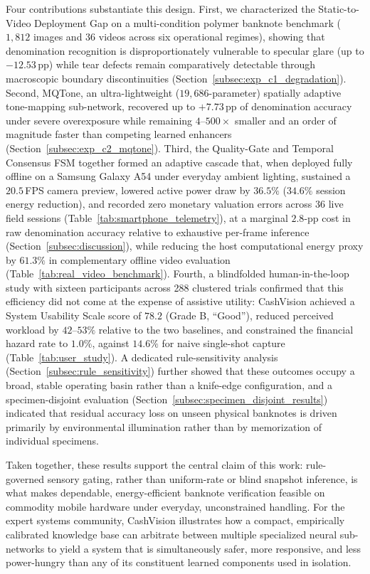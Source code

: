 \documentclass[final,5p,times,twocolumn,authoryear]{elsarticle}
\begin{document}
Four contributions substantiate this design. First, we characterized the Static-to-Video Deployment Gap on a multi-condition polymer banknote benchmark ($1{,}812$ images and $36$ videos across six operational regimes), showing that denomination recognition is disproportionately vulnerable to specular glare (up to $-12.53$\,pp) while tear defects remain comparatively detectable through macroscopic boundary discontinuities (Section~\ref{subsec:exp_c1_degradation}). Second, MQTone, an ultra-lightweight ($19{,}686$-parameter) spatially adaptive tone-mapping sub-network, recovered up to $+7.73$\,pp of denomination accuracy under severe overexposure while remaining $4$--$500\times$ smaller and an order of magnitude faster than competing learned enhancers (Section~\ref{subsec:exp_c2_mqtone}). Third, the Quality-Gate and Temporal Consensus FSM together formed an adaptive cascade that, when deployed fully offline on a Samsung Galaxy A54 under everyday ambient lighting, sustained a $20.5$\,FPS camera preview, lowered active power draw by $36.5\%$ ($34.6\%$ session energy reduction), and recorded zero monetary valuation errors across 36 live field sessions (Table~\ref{tab:smartphone_telemetry}), at a marginal $2.8$-pp cost in raw denomination accuracy relative to exhaustive per-frame inference (Section~\ref{subsec:discussion}), while reducing the host computational energy proxy by $61.3\%$ in complementary offline video evaluation (Table~\ref{tab:real_video_benchmark}). Fourth, a blindfolded human-in-the-loop study with sixteen participants across 288 clustered trials confirmed that this efficiency did not come at the expense of assistive utility: CashVision achieved a System Usability Scale score of $78.2$ (Grade B, ``Good''), reduced perceived workload by $42$--$53\%$ relative to the two baselines, and constrained the financial hazard rate to $1.0\%$, against $14.6\%$ for naive single-shot capture (Table~\ref{tab:user_study}). A dedicated rule-sensitivity analysis (Section~\ref{subsec:rule_sensitivity}) further showed that these outcomes occupy a broad, stable operating basin rather than a knife-edge configuration, and a specimen-disjoint evaluation (Section~\ref{subsec:specimen_disjoint_results}) indicated that residual accuracy loss on unseen physical banknotes is driven primarily by environmental illumination rather than by memorization of individual specimens.

Taken together, these results support the central claim of this work: rule-governed sensory gating, rather than uniform-rate or blind snapshot inference, is what makes dependable, energy-efficient banknote verification feasible on commodity mobile hardware under everyday, unconstrained handling. For the expert systems community, CashVision illustrates how a compact, empirically calibrated knowledge base can arbitrate between multiple specialized neural sub-networks to yield a system that is simultaneously safer, more responsive, and less power-hungry than any of its constituent learned components used in isolation.
\end{document}
